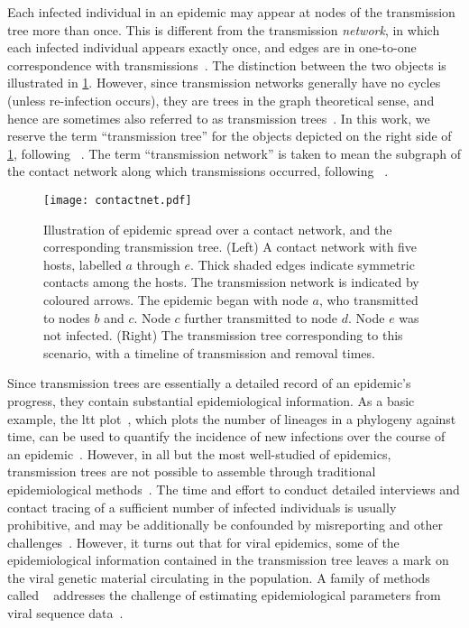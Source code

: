 Each infected individual in an epidemic may appear at nodes of the transmission
tree more than once. This is different from the transmission \emph{network}, in
which each infected individual appears exactly once, and edges are in
one-to-one correspondence with transmissions~\autocite{welch2011statistical,
keeling2005networks}. The distinction between the two objects is illustrated in
\cref{fig:contactnet}. However, since transmission networks generally have no
cycles (unless re-infection occurs), they are trees in the graph theoretical
sense, and hence are sometimes also referred to as transmission
trees~\autocite[\eg][]{kenah2015algorithms}. In this work, we reserve the term
``transmission tree'' for the objects depicted on the right side of
\cref{fig:contactnet}, following \eg~\autocite{stadler2013uncovering}. The term
``transmission network'' is taken to mean the subgraph of the contact network
along which transmissions occurred, following
\eg~\autocite{welch2011statistical, keeling2005networks}.

\begin{figure}
    \centering
    \texttt{[image: contactnet.pdf]}
    \caption[Illustration of a contact network and transmission tree.]{
      Illustration of epidemic spread over a contact network, and the
      corresponding transmission tree. (Left) A contact network with five
      hosts, labelled $a$ through $e$. Thick shaded edges indicate symmetric
      contacts among the hosts. The transmission network is indicated by
      coloured arrows. The epidemic began with node $a$, who transmitted to
      nodes $b$ and $c$. Node $c$ further transmitted to node $d$. Node $e$ was
      not infected. (Right) The transmission tree corresponding to this
      scenario, with a timeline of transmission and removal times.
    }
    \label{fig:contactnet}
\end{figure}

Since transmission trees are essentially a detailed record of an epidemic's
progress, they contain substantial epidemiological information. As a basic
example, the \gls{ltt} plot~\autocite{nee1992tempo}, which plots the number of
lineages in a phylogeny against time, can be used to quantify the incidence of
new infections over the course of an epidemic~\autocite{holmes1995revealing}.
However, in all but the most well-studied of epidemics, transmission trees are
not possible to assemble through traditional epidemiological
methods~\autocite{welch2011statistical}. The time and effort to conduct
detailed interviews and contact tracing of a sufficient number of infected
individuals is usually prohibitive, and may be additionally be confounded by
misreporting and other challenges~\autocite{eames2015six}. However, it turns
out that for viral epidemics, some of the epidemiological information contained
in the transmission tree leaves a mark on the viral genetic material
circulating in the population. A family of methods called
~\autocite{grenfell2004unifying} addresses the challenge of
estimating epidemiological parameters from viral sequence
data~\autocite{volz2013viral}.

